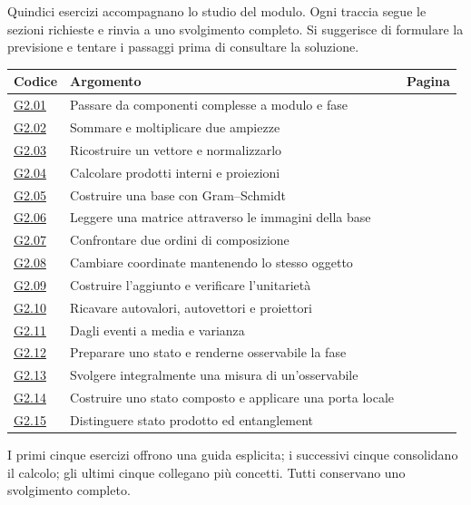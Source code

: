 \clearpage{}\label{exercise-index-2}
Quindici esercizi accompagnano lo studio del modulo. Ogni traccia segue le sezioni richieste e rinvia a uno svolgimento completo. Si suggerisce di formulare la previsione e tentare i passaggi prima di consultare la soluzione.
\begin{longtable}{@{}p{13mm}p{75mm}r@{}}\toprule Codice & Argomento & Pagina\\\midrule\endhead
\hyperref[ex-G2.01]{G2.01} & Passare da componenti complesse a modulo e fase & \pageref{ex-G2.01}\\[3pt]
\hyperref[ex-G2.02]{G2.02} & Sommare e moltiplicare due ampiezze & \pageref{ex-G2.02}\\[3pt]
\hyperref[ex-G2.03]{G2.03} & Ricostruire un vettore e normalizzarlo & \pageref{ex-G2.03}\\[3pt]
\hyperref[ex-G2.04]{G2.04} & Calcolare prodotti interni e proiezioni & \pageref{ex-G2.04}\\[3pt]
\hyperref[ex-G2.05]{G2.05} & Costruire una base con Gram--Schmidt & \pageref{ex-G2.05}\\[3pt]
\hyperref[ex-G2.06]{G2.06} & Leggere una matrice attraverso le immagini della base & \pageref{ex-G2.06}\\[3pt]
\hyperref[ex-G2.07]{G2.07} & Confrontare due ordini di composizione & \pageref{ex-G2.07}\\[3pt]
\hyperref[ex-G2.08]{G2.08} & Cambiare coordinate mantenendo lo stesso oggetto & \pageref{ex-G2.08}\\[3pt]
\hyperref[ex-G2.09]{G2.09} & Costruire l'aggiunto e verificare l'unitarietà & \pageref{ex-G2.09}\\[3pt]
\hyperref[ex-G2.10]{G2.10} & Ricavare autovalori, autovettori e proiettori & \pageref{ex-G2.10}\\[3pt]
\hyperref[ex-G2.11]{G2.11} & Dagli eventi a media e varianza & \pageref{ex-G2.11}\\[3pt]
\hyperref[ex-G2.12]{G2.12} & Preparare uno stato e renderne osservabile la fase & \pageref{ex-G2.12}\\[3pt]
\hyperref[ex-G2.13]{G2.13} & Svolgere integralmente una misura di un'osservabile & \pageref{ex-G2.13}\\[3pt]
\hyperref[ex-G2.14]{G2.14} & Costruire uno stato composto e applicare una porta locale & \pageref{ex-G2.14}\\[3pt]
\hyperref[ex-G2.15]{G2.15} & Distinguere stato prodotto ed entanglement & \pageref{ex-G2.15}\\[3pt]
\bottomrule\end{longtable}
{\small I primi cinque esercizi offrono una guida esplicita; i successivi cinque consolidano il calcolo; gli ultimi cinque collegano più concetti. Tutti conservano uno svolgimento completo.}\par
